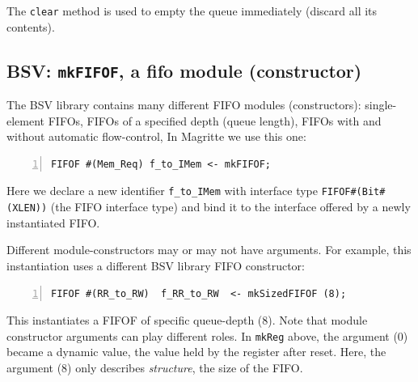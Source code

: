 The \verb|clear| method is used to empty the queue immediately
(discard all its contents).


\subsection{BSV: {\tt mkFIFOF}, a fifo module (constructor)}



The BSV library contains many different FIFO modules (constructors):
single-element FIFOs, FIFOs of a specified depth (queue length), FIFOs
with and without automatic flow-control, {\etc} In Magritte we use
this one:


\begin{Verbatim}[frame=single, numbers=left]
   FIFOF #(Mem_Req) f_to_IMem <- mkFIFOF;
\end{Verbatim}

Here we declare a new identifier \verb|f_to_IMem| with interface type
\verb|FIFOF#(Bit#(XLEN))| (the FIFO interface type) and bind it to the
interface offered by a newly instantiated FIFO.

Different module-constructors may or may not have arguments.  For
example, this instantiation uses a different BSV library FIFO
constructor:


\begin{Verbatim}[frame=single, numbers=left]
   FIFOF #(RR_to_RW)  f_RR_to_RW  <- mkSizedFIFOF (8);
\end{Verbatim}

This instantiates a FIFOF of specific queue-depth (8).  Note that
module constructor arguments can play different roles.  In
\verb|mkReg| above, the argument (0) became a dynamic value, the value
held by the register after reset.  Here, the argument (8) only
describes \emph{structure}, {\ie} the size of the FIFO.

